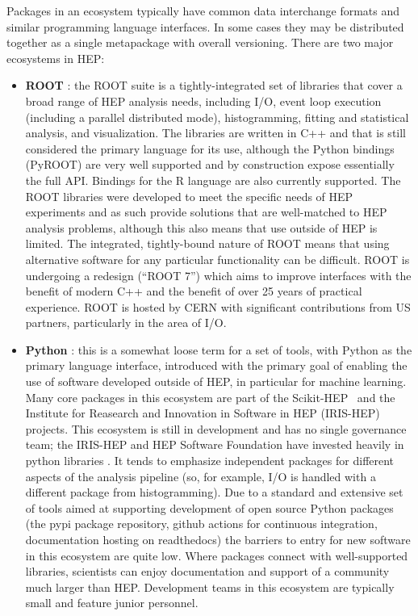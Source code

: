 Packages in an ecosystem typically have common data interchange formats and similar programming language interfaces. In some cases they may be distributed together as a single metapackage with overall versioning. There are two major ecosystems in HEP:
\begin{itemize}
    \item \textbf{ROOT} \cite{Brun:1997pa}: the ROOT suite is a tightly-integrated set of libraries that cover a broad range of HEP analysis needs, including I/O, event loop execution (including a parallel distributed mode), histogramming, fitting and statistical analysis, and visualization. The libraries are written in C++ and that is still considered the primary language for its use, although the Python bindings (PyROOT) are very well supported and by construction expose essentially the full API.  Bindings for the R language are also currently supported. The ROOT libraries were developed to meet the specific needs of HEP experiments and as such provide solutions that are well-matched to HEP analysis problems, although this also means that use outside of HEP is limited. The integrated, tightly-bound nature of ROOT means that using alternative software for any particular functionality can be difficult. ROOT is undergoing a redesign \cite{Naumann:2022pub} (``ROOT 7'') which aims to improve interfaces with the benefit of modern C++ and the benefit of over 25 years of practical experience. ROOT is hosted by CERN with significant contributions from US partners, particularly in the area of I/O.
    \item \textbf{Python} \cite{van1995python,10.5555/1593511}: this is a somewhat loose term for a set of tools, with Python as the primary language interface, introduced with the primary goal of enabling the use of software developed outside of HEP, in particular for machine learning. Many core packages in this ecosystem are part of the Scikit-HEP~\cite{Rodrigues:2020syo} and the Institute for Reasearch and Innovation in Software in HEP (IRIS-HEP)~\cite{IRISHEPWEB} projects. This ecosystem is still in development and has no single governance team; the IRIS-HEP and HEP Software Foundation have invested heavily in python libraries \cite{Pivarski:2022ycs,}. It tends to emphasize independent packages for different aspects of the analysis pipeline (so, for example, I/O is handled with a different package from histogramming). Due to a standard and extensive set of tools aimed at supporting development of open source Python packages (the pypi package repository, github actions for continuous integration, documentation hosting on readthedocs) the barriers to entry for new software in this ecosystem are quite low. Where packages connect with well-supported libraries, scientists can enjoy documentation and support of a community much larger than HEP.  Development teams in this ecosystem are typically small and feature junior personnel.
\end{itemize}

